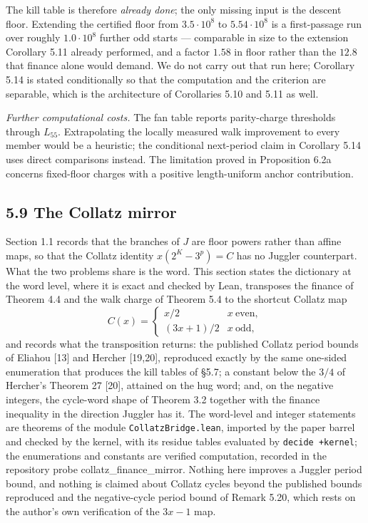 \documentclass[12pt]{article}
\begin{document}
The kill table is therefore \emph{already done}; the only missing input
is the descent floor. Extending the certified floor from
\(3.5\cdot10^{8}\) to \(5.54\cdot10^{8}\) is a first-passage run over
roughly \(1.0\cdot10^{8}\) further odd starts --- comparable in size to
the extension Corollary 5.11 already performed, and a factor \(1.58\) in
floor rather than the \(12.8\) that finance alone would demand. We do
not carry out that run here; Corollary 5.14 is stated conditionally so
that the computation and the criterion are separable, which is the
architecture of Corollaries 5.10 and 5.11 as well.

\emph{Further computational costs.} The fan table reports parity-charge
thresholds through \(L_{55}\). Extrapolating the locally measured walk
improvement to every member would be a heuristic; the conditional
next-period claim in Corollary 5.14 uses direct comparisons instead. The
limitation proved in Proposition 6.2a concerns fixed-floor charges with
a positive length-uniform anchor contribution.

\subsection{5.9 The Collatz mirror}\label{the-collatz-mirror}

Section 1.1 records that the branches of \(J\) are floor powers rather
than affine maps, so that the Collatz identity \(x(2^K-3^p)=C\) has no
Juggler counterpart. What the two problems share is the word. This
section states the dictionary at the word level, where it is exact and
checked by Lean, transposes the finance of Theorem 4.4 and the walk
charge of Theorem 5.4 to the shortcut Collatz map \[
C(x)=\begin{cases} x/2 & x\ \text{even},\\ (3x+1)/2 & x\ \text{odd},\end{cases}
\] and records what the transposition returns: the published Collatz
period bounds of Eliahou {[}13{]} and Hercher {[}19,20{]}, reproduced
exactly by the same one-sided enumeration that produces the kill tables
of §5.7; a constant below the \(3/4\) of Hercher's Theorem 27 {[}20{]},
attained on the hug word; and, on the negative integers, the cycle-word
shape of Theorem 3.2 together with the finance inequality in the
direction Juggler has it. The word-level and integer statements are
theorems of the module \texttt{\nolinkurl{CollatzBridge.lean}}, imported
by the paper barrel and checked by the kernel, with its residue tables
evaluated by \texttt{decide\ +kernel}; the enumerations and constants
are verified computation, recorded in the repository probe
collatz\_finance\_mirror. Nothing here improves a Juggler period bound,
and nothing is claimed about Collatz cycles beyond the published bounds
reproduced and the negative-cycle period bound of Remark 5.20, which
rests on the author's own verification of the \(3x-1\) map.
\end{document}
